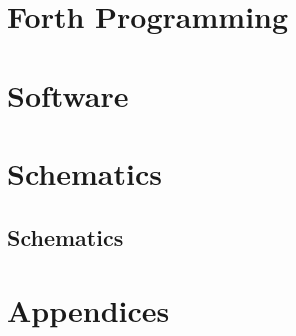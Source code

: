 \ifdefined\renderpartforth
\part{Forth Programming}
  \glsresetall


\fi



\ifdefined\renderpartsoftware
\part{Software}
  \glsresetall


\fi


\ifdefined\renderpartschematics
\part{Schematics}

\chapter{Schematics}
\glsresetall
 
\fi


\ifdefined\renderpartbackmatter
  \appendix
  \part{Appendices}

  \backmatter
  \renewcommand{\thepage}{\roman{page}}

  \glsaddall
  \printglossaries

  \printindex
\fi



